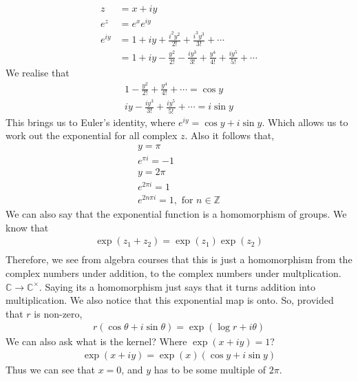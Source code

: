 \documentclass{article}
\begin{document}
\begin{align*}
	z      & = x+iy                                                                                   \\
	e^z    & = e^x e^{iy}                                                                             \\
	e^{iy} & = 1+iy+\frac{i^2y^2}{2!}+\frac{i^3y^3}{3!}+\cdots                                        \\
	       & = 1 + iy - \frac{y^2}{2!}	 - \frac{iy^3}{3!} + \frac{y^4}{4!} + \frac{iy^5}{5!} + \cdots
\end{align*}
We realise that
\begin{gather*}
	1 - \frac{y^2}{2!} + \frac{y^4}{4!} + \cdots  = \cos y \\
	iy - \frac{iy^3}{3!} + \frac{iy^5}{5!} + \cdots = i\sin y
\end{gather*}
This brings us to Euler's identity, where $e^{iy} = \cos y + i\sin y$. Which
allows us to work out the exponential for all complex $z$. Also it
follows that,
\begin{gather*}
	y = \pi \\
	e^{\pi i} = -1 \\
	y = 2 \pi \\
	e^{2\pi i} = 1 \\
	e^{2n\pi i} = 1, \text{ for } n \in \mathbb{Z}
\end{gather*}
We can also say that the exponential function is a homomorphism of groups. We know that
\begin{gather*}
	\exp(z_1 + z_2) = \exp(z_1)\exp(z_2) \\
\end{gather*}
Therefore, we see from algebra courses that this is just a homomorphism from the complex numbers under
addition, to the complex numbers under multplication. $ \mathbb{C} \rightarrow
	\mathbb{C}^\times $. Saying its a homomorphism just says that it turns addition into multiplication.
We also notice that this exponential map is onto. So, provided that $r$ is non-zero,
\begin{gather*}
	r(\cos\theta + i \sin \theta ) = \exp(\log r + i \theta)
\end{gather*}
We can also ask what is the kernel? Where $	\exp(x + iy) = 1$?
\begin{gather*}
	\exp(x+iy) = \exp(x)(\cos y + i \sin y)
\end{gather*}
Thus we can see that $x = 0$, and $y$ has to be some multiple of $2\pi$.
\end{document}
